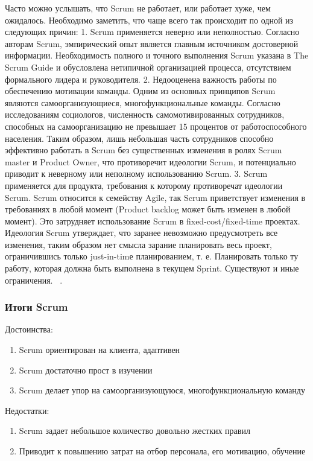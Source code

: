 \documentclass{../industrial-development}
\begin{document}
\lecturenotes
Часто можно услышать, что Scrum не работает, или работает хуже, чем ожидалось. Необходимо заметить, что чаще всего так происходит по одной из следующих причин: 1. Scrum применяется неверно или неполностью. Согласно авторам Scrum, эмпирический опыт является главным источником достоверной информации. Необходимость полного и точного выполнения Scrum указана в The Scrum Guide и обусловлена нетипичной организацией процесса, отсутствием формального лидера и руководителя. 2. Недооценена важность работы по обеспечению мотивации команды. Одним из основных принципов Scrum являются самоорганизующиеся, многофункциональные команды. Согласно исследованиям социологов, численность самомотивированных сотрудников, способных на самоорганизацию не превышает 15 процентов от работоспособного населения. Таким образом, лишь небольшая часть сотрудников способно эффективно работать в Scrum без существенных изменения в ролях Scrum master и Product Owner, что противоречит идеологии Scrum, и потенциально приводит к неверному или неполному использованию Scrum. 3. Scrum применяется для продукта, требования к которому противоречат идеологии Scrum. Scrum относится к семейству Agile, так Scrum приветствует изменения в требованиях в любой момент (Product backlog может быть изменен в любой момент). Это затрудняет использование Scrum в fixed-cost/fixed-time проектах. Идеология Scrum утверждает, что заранее невозможно предусмотреть все изменения, таким образом нет смысла зарание планировать весь проект, ограничившись только just-in-timе планированием, т. е. Планировать только ту работу, которая должна быть выполнена в текущем Sprint. Существуют и иные ограничения. 
~\cite{Fowler}.


\begin{frame} \frametitle{Итоги Scrum}
Достоинства:
	\begin{enumerate}
		\item Scrum ориентирован на клиента, адаптивен 
		\item Scrum достаточно прост в изучении 
		\item Scrum делает упор на самоорганизующуюся, многофункциональную команду 
	\end{enumerate}	
Недостатки:
	\begin{enumerate}
		\item Scrum задает небольшое количество довольно жестких правил 
		\item Приводит к повышению затрат на отбор персонала, его мотивацию, обучение
	\end{enumerate}	
\end{frame}
\end{document}
